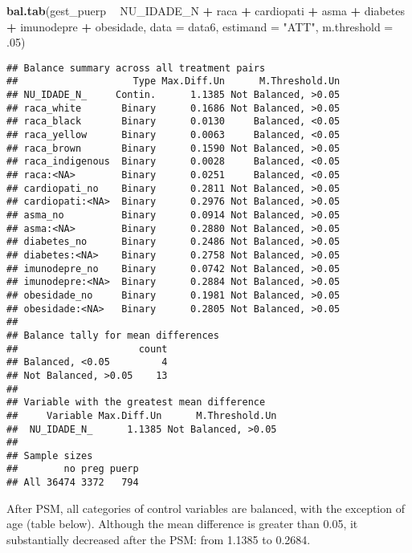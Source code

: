 \documentclass[
]{article}
\newenvironment{Shaded}{\begin{snugshade}}{\end{snugshade}}
\newcommand{\DataTypeTok}[1]{\textcolor[rgb]{0.13,0.29,0.53}{#1}}
\newcommand{\FloatTok}[1]{\textcolor[rgb]{0.00,0.00,0.81}{#1}}
\newcommand{\KeywordTok}[1]{\textcolor[rgb]{0.13,0.29,0.53}{\textbf{#1}}}
\newcommand{\NormalTok}[1]{#1}
\newcommand{\OperatorTok}[1]{\textcolor[rgb]{0.81,0.36,0.00}{\textbf{#1}}}
\newcommand{\StringTok}[1]{\textcolor[rgb]{0.31,0.60,0.02}{#1}}
\begin{document}
\begin{Shaded}
\begin{Highlighting}[]
\KeywordTok{bal.tab}\NormalTok{(gest_puerp }\OperatorTok{~}\StringTok{ }\NormalTok{NU_IDADE_N }\OperatorTok{+}\StringTok{ }\NormalTok{raca }\OperatorTok{+}\StringTok{ }\NormalTok{cardiopati }\OperatorTok{+}\StringTok{ }\NormalTok{asma }\OperatorTok{+}\StringTok{ }\NormalTok{diabetes }\OperatorTok{+}\StringTok{ }\NormalTok{imunodepre }\OperatorTok{+}\StringTok{ }\NormalTok{obesidade, }\DataTypeTok{data =}\NormalTok{ data6, }\DataTypeTok{estimand =} \StringTok{"ATT"}\NormalTok{, }\DataTypeTok{m.threshold =} \FloatTok{.05}\NormalTok{)}
\end{Highlighting}
\end{Shaded}

\begin{verbatim}
## Balance summary across all treatment pairs
##                    Type Max.Diff.Un      M.Threshold.Un
## NU_IDADE_N_     Contin.      1.1385 Not Balanced, >0.05
## raca_white       Binary      0.1686 Not Balanced, >0.05
## raca_black       Binary      0.0130     Balanced, <0.05
## raca_yellow      Binary      0.0063     Balanced, <0.05
## raca_brown       Binary      0.1590 Not Balanced, >0.05
## raca_indigenous  Binary      0.0028     Balanced, <0.05
## raca:<NA>        Binary      0.0251     Balanced, <0.05
## cardiopati_no    Binary      0.2811 Not Balanced, >0.05
## cardiopati:<NA>  Binary      0.2976 Not Balanced, >0.05
## asma_no          Binary      0.0914 Not Balanced, >0.05
## asma:<NA>        Binary      0.2880 Not Balanced, >0.05
## diabetes_no      Binary      0.2486 Not Balanced, >0.05
## diabetes:<NA>    Binary      0.2758 Not Balanced, >0.05
## imunodepre_no    Binary      0.0742 Not Balanced, >0.05
## imunodepre:<NA>  Binary      0.2884 Not Balanced, >0.05
## obesidade_no     Binary      0.1981 Not Balanced, >0.05
## obesidade:<NA>   Binary      0.2805 Not Balanced, >0.05
## 
## Balance tally for mean differences
##                     count
## Balanced, <0.05         4
## Not Balanced, >0.05    13
## 
## Variable with the greatest mean difference
##     Variable Max.Diff.Un      M.Threshold.Un
##  NU_IDADE_N_      1.1385 Not Balanced, >0.05
## 
## Sample sizes
##        no preg puerp
## All 36474 3372   794
\end{verbatim}

After PSM, all categories of control variables are balanced, with the
exception of age (table below). Although the mean difference is greater
than 0.05, it substantially decreased after the PSM: from 1.1385 to
0.2684.
\end{document}
